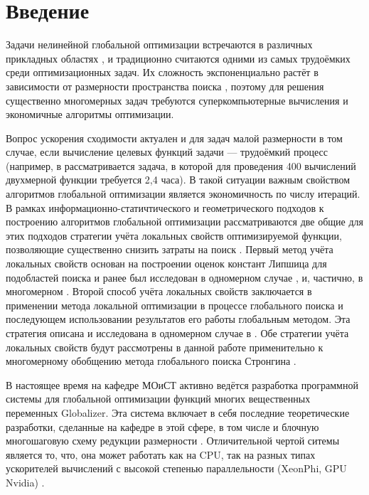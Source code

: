 \section{Введение}
Задачи нелинейной глобальной оптимизации встречаются в различных прикладных областях \cite{Kvasov2013, Barkalov2013},
и традиционно считаются одними из самых трудоёмких среди оптимизационных задач.
Их сложность экспоненциально растёт в зависимости от размерности пространства поиска \cite{Vavasis1995},
поэтому для решения существенно многомерных задач требуются суперкомпьютерные вычисления и
экономичные алгоритмы оптимизации.

Вопрос ускорения сходимости актуален и для задач малой размерности в том случае, если вычисление
целевых функций задачи --- трудоёмкий процесс (например, в \cite{Barkalov2013} рассматривается
задача, в которой для проведения 400 вычислений двухмерной функции требуется 2,4 часа).
В такой ситуации важным свойством алгоритмов глобальной оптимизации является экономичность по
числу итераций. В рамках информационно-статичтического \cite{strOptBook} и геометрического подходов \cite{piyavskij1972} к
построению алгоритмов глобальной оптимизации рассматриваются две общие для этих подходов
стратегии учёта локальных свойств оптимизируемой функции, позволяющие существенно
снизить затраты на поиск \cite{sergLocalTuning}. Первый метод учёта локальных свойств
основан на построении оценок констант Липшица для подобластей поиска и ранее был
исследован в одномерном случае \cite{sergLocalTuning,nestedLocal}, и, частично, в многомерном \cite{strongSerg}.
Второй способ учёта локальных свойств заключается в применении метода локальной оптимизации в процессе глобального
поиска и последующем использовании результатов его работы глобальным методом. Эта стратегия
описана и исследована в одномерном случае в \cite{sergLocalTuning}. Обе стратегии
учёта локальных свойств будут рассмотрены в данной работе применительно к многомерному
обобщению метода глобального поиска Стронгина \cite{strOptBook}.

В настоящее время на кафедре МОиСТ активно ведётся разработка программной системы
для глобальной оптимизации функций многих вещественных переменных Globalizer.
Эта система включает в себя последние теоретические разработки, сделанные на кафедре в
этой сфере, в том числе и блочную многошаговую схему редукции размерности \cite{blockNested}.
Отличительной чертой ситемы является то, что, она может работать как на CPU, так на
разных типах ускорителей вычислений с высокой степенью параллельности (XeonPhi, GPU Nvidia) \cite{examinArtcle, examinphiArtcle}.


